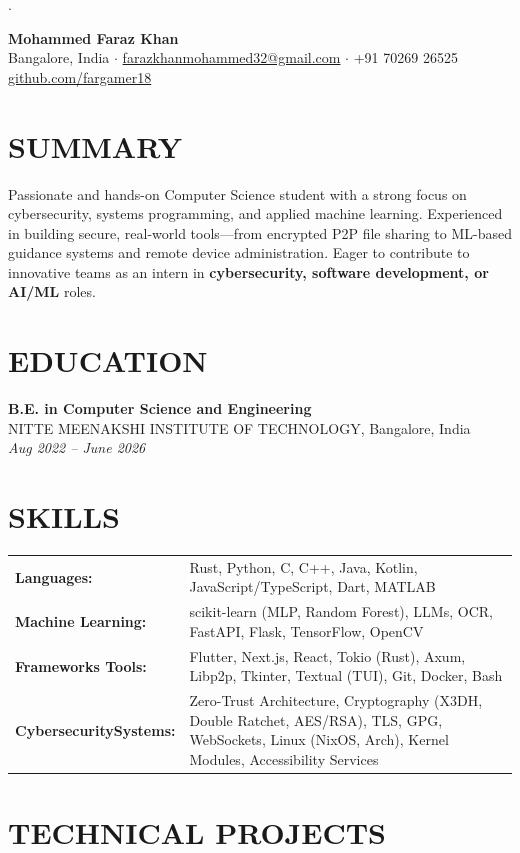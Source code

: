 .\documentclass[11pt]{article}
\newcommand{\contact}[3]{
  \begin{center}
    {\Large\textbf{#1}} \\[0.5em]
    #2 $\cdot$ \href{mailto:#3}{#3} $\cdot$ +91 70269 26525 \\[0.3em]
    \href{https://github.com/fargamer18}{github.com/fargamer18}
  \end{center}
}
\begin{document}
\contact{Mohammed Faraz Khan}{Bangalore, India}{farazkhanmohammed32@gmail.com}

\section*{SUMMARY}
Passionate and hands-on Computer Science student with a strong focus on cybersecurity, systems programming, and applied machine learning. Experienced in building secure, real-world tools—from encrypted P2P file sharing to ML-based guidance systems and remote device administration. Eager to contribute to innovative teams as an intern in \textbf{cybersecurity, software development, or AI/ML} roles.

\section*{EDUCATION}
\textbf{B.E. in Computer Science and Engineering} \\
NITTE MEENAKSHI INSTITUTE OF TECHNOLOGY, Bangalore, India \\
\textit{Aug 2022 -- June 2026}

\section*{SKILLS}
\begin{tabular}{@{}p{} @{}p{}}
    \textbf{Languages:}         & Rust, Python, C, C++, Java, Kotlin, JavaScript/TypeScript, Dart, MATLAB \\
    \textbf{Machine Learning:}  & scikit-learn (MLP, Random Forest), LLMs, OCR, FastAPI, Flask, TensorFlow, OpenCV \\
    \textbf{Frameworks Tools:}& Flutter, Next.js, React, Tokio (Rust), Axum, Libp2p, Tkinter, Textual (TUI), Git, Docker, Bash \\
    \textbf{Cybersecurity}\newline\textbf{Systems:} & Zero-Trust Architecture, Cryptography (X3DH, Double Ratchet, AES/RSA), TLS, GPG, WebSockets, Linux (NixOS, Arch), Kernel Modules, Accessibility Services \\
\end{tabular}
\section*{TECHNICAL PROJECTS}
\end{document}
